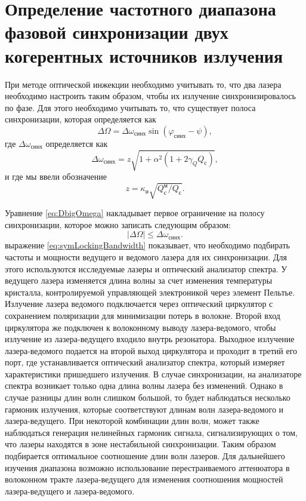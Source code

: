 \section{Определение частотного диапазона фазовой синхронизации двух когерентных источников излучения}\label{sec:ch2/sect2}
При методе оптической инжекции необходимо учитывать то, что два лазера необходимо настроить таким образом, чтобы их излучение синхронизировалось по фазе. Для этого необходимо учитывать то, что существует полоса синхронизации, которая определяется как 
\begin{equation}\label{eq:DbigOmega}
	\Delta \Omega=\Delta \omega_{\text{синх}} \sin(\varphi_{\text{синх}}-\psi),
\end{equation}
где $\Delta \omega_{\text{синх}}$ определяется как
\begin{equation}\label{eq:lockingBandwidth}
	\Delta \omega_{\text{синх}} = z\sqrt{1+\alpha^2(1+2\gamma_Q Q_\text{с})},
\end{equation}
и где мы ввели обозначение
\begin{equation}\label{eq:z}
	z=\kappa_{\text{и}}\sqrt{Q^{\text{м}}_\text{с}/Q_\text{с}}.
\end{equation}

Уравнение \eqref{eq:DbigOmega} накладывает первое ограничение на полосу синхронизации, которое можно записать следующим образом:
\begin{equation}\label{eq:symLockingBandwidth}
	\lvert \Delta \Omega \rvert \le\Delta \omega_{\text{синх}}.
\end{equation}
выражение \ref{eq:symLockingBandwidth} показывает, что необходимо подбирать частоты и мощности ведущего и ведомого лазера для их синхронизации. 
\newline Для этого используются исследуемые лазеры и оптический анализатор спектра. У ведущего лазера изменяется длина волны за счет изменения температуры кристалла, контролируемой управляющей электроникой через элемент Пельтье. Излучение лазера ведомого подключается через оптический циркулятор с сохранением поляризации для минимизации потерь в волокне. Второй вход циркулятора же подключен к волоконному выводу лазера-ведомого, чтобы излучение из лазера-ведущего входило внутрь резонатора. Выходное излучение лазера-ведомого подается на второй выход циркулятора и проходит в третий его порт, где устанавливается оптический анализатор спектра, который измеряет характеристики пришедшего излучения. В случае синхронизации, на анализаторе спектра возникает только одна длина волны лазера без изменений. Однако в случае разницы длин волн слишком большой, то будет наблюдаться несколько гармоник излучения, которые соответствуют длинам волн лазера-ведомого и лазера-ведущего. При некоторой комбинации длин волн, может также наблюдаться генерация нелинейных гармоник сигнала, сигнализирующих о том, что лазеры находятся в зоне нестабильной синхронизации. 
Таким образом подбирается оптимальное соотношение длин волн лазеров. Для дальнейшего изучения диапазона возможно использование перестраиваемого аттенюатора в волоконном тракте лазера-ведущего для изменения соотношения мощностей лазера-ведущего и лазера-ведомого.
